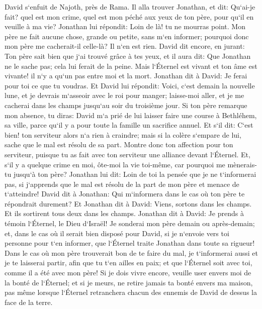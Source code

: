 \verse David s`enfuit de Najoth, près de Rama. Il alla trouver Jonathan, et dit: Qu`ai-je fait? quel est mon crime, quel est mon péché aux yeux de ton père, pour qu`il en veuille à ma vie? 
\verse Jonathan lui répondit: Loin de là! tu ne mourras point. Mon père ne fait aucune chose, grande ou petite, sans m`en informer; pourquoi donc mon père me cacherait-il celle-là? Il n`en est rien. 
\verse David dit encore, en jurant: Ton père sait bien que j`ai trouvé grâce à tes yeux, et il aura dit: Que Jonathan ne le sache pas; cela lui ferait de la peine. Mais l`Éternel est vivant et ton âme est vivante! il n`y a qu`un pas entre moi et la mort. 
\verse Jonathan dit à David: Je ferai pour toi ce que tu voudras. 
\verse Et David lui répondit: Voici, c`est demain la nouvelle lune, et je devrais m`asseoir avec le roi pour manger; laisse-moi aller, et je me cacherai dans les champs jusqu`au soir du troisième jour. 
\verse Si ton père remarque mon absence, tu diras: David m`a prié de lui laisser faire une course à Bethléhem, sa ville, parce qu`il y a pour toute la famille un sacrifice annuel. 
\verse Et s`il dit: C`est bien! ton serviteur alors n`a rien à craindre; mais si la colère s`empare de lui, sache que le mal est résolu de sa part. 
\verse Montre donc ton affection pour ton serviteur, puisque tu as fait avec ton serviteur une alliance devant l`Éternel. Et, s`il y a quelque crime en moi, ôte-moi la vie toi-même, car pourquoi me mènerais-tu jusqu`à ton père? 
\verse Jonathan lui dit: Loin de toi la pensée que je ne t`informerai pas, si j`apprends que le mal est résolu de la part de mon père et menace de t`atteindre! 
\verse David dit à Jonathan: Qui m`informera dans le cas où ton père te répondrait durement? 
\verse Et Jonathan dit à David: Viens, sortons dans les champs. Et ils sortirent tous deux dans les champs. 
\verse Jonathan dit à David: Je prends à témoin l`Éternel, le Dieu d`Israël! Je sonderai mon père demain ou après-demain; et, dans le cas où il serait bien disposé pour David, si je n`envoie vers toi personne pour t`en informer, 
\verse que l`Éternel traite Jonathan dans toute sa rigueur! Dans le cas où mon père trouverait bon de te faire du mal, je t`informerai aussi et je te laisserai partir, afin que tu t`en ailles en paix; et que l`Éternel soit avec toi, comme il a été avec mon père! 
\verse Si je dois vivre encore, veuille user envers moi de la bonté de l`Éternel; 
\verse et si je meurs, ne retire jamais ta bonté envers ma maison, pas même lorsque l`Éternel retranchera chacun des ennemis de David de dessus la face de la terre. 
